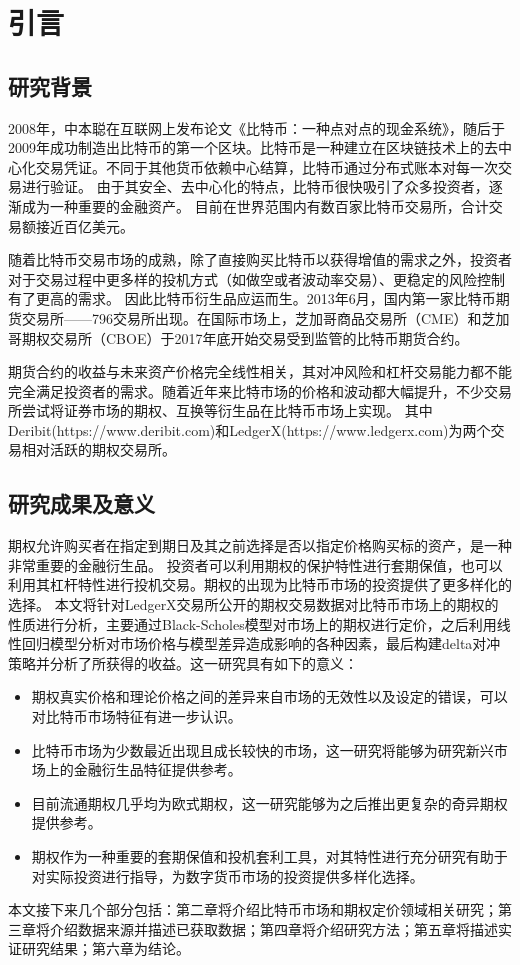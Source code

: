 \chapter{引言}
\section{研究背景}
\par{2008年，中本聪在互联网上发布论文《比特币：一种点对点的现金系统》\cite{Nakamoto_bitcoin:a}，随后于2009年成功制造出比特币的第一个区块。比特币是一种建立在区块链技术上的去中心化交易凭证。不同于其他货币依赖中心结算，比特币通过分布式账本对每一次交易进行验证。
由于其安全、去中心化的特点，比特币很快吸引了众多投资者，逐渐成为一种重要的金融资产。
目前在世界范围内有数百家比特币交易所，合计交易额接近百亿美元。
}
\par{随着比特币交易市场的成熟，除了直接购买比特币以获得增值的需求之外，投资者对于交易过程中更多样的投机方式（如做空或者波动率交易）、更稳定的风险控制有了更高的需求。
因此比特币衍生品应运而生。2013年6月，国内第一家比特币期货交易所——796交易所出现。在国际市场上，芝加哥商品交易所（CME）和芝加哥期权交易所（CBOE）于2017年底开始交易受到监管的比特币期货合约。
}
\par{期货合约的收益与未来资产价格完全线性相关，其对冲风险和杠杆交易能力都不能完全满足投资者的需求。随着近年来比特市场的价格和波动都大幅提升，不少交易所尝试将证券市场的期权、互换等衍生品在比特币市场上实现。
其中Deribit(https://www.deribit.com)和LedgerX(https://www.ledgerx.com)为两个交易相对活跃的期权交易所。}
\section{研究成果及意义}
期权允许购买者在指定到期日及其之前选择是否以指定价格购买标的资产，是一种非常重要的金融衍生品。
投资者可以利用期权的保护特性进行套期保值，也可以利用其杠杆特性进行投机交易。期权的出现为比特币市场的投资提供了更多样化的选择。
本文将针对LedgerX交易所公开的期权交易数据对比特币市场上的期权的性质进行分析，主要通过Black-Scholes模型对市场上的期权进行定价，之后利用线性回归模型分析对市场价格与模型差异造成影响的各种因素，最后构建delta对冲策略并分析了所获得的收益。这一研究具有如下的意义：
\begin{itemize}
    \item 期权真实价格和理论价格之间的差异来自市场的无效性以及设定的错误，可以对比特币市场特征有进一步认识。
    \item  比特币市场为少数最近出现且成长较快的市场，这一研究将能够为研究新兴市场上的金融衍生品特征提供参考。
    \item 目前流通期权几乎均为欧式期权，这一研究能够为之后推出更复杂的奇异期权提供参考。
    \item 期权作为一种重要的套期保值和投机套利工具，对其特性进行充分研究有助于对实际投资进行指导，为数字货币市场的投资提供多样化选择。
  \end{itemize}
  
本文接下来几个部分包括：第二章将介绍比特币市场和期权定价领域相关研究；第三章将介绍数据来源并描述已获取数据；第四章将介绍研究方法；第五章将描述实证研究结果；第六章为结论。